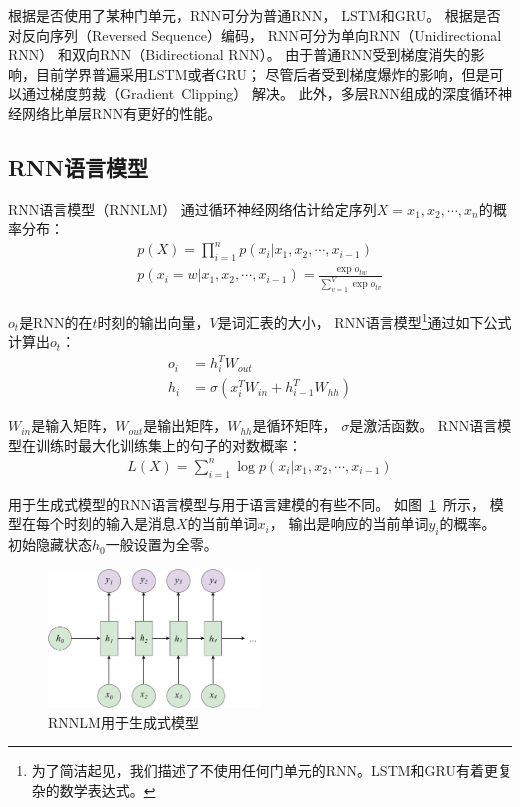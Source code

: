 根据是否使用了某种门单元，RNN可分为普通RNN，
LSTM和GRU。
根据是否对反向序列（Reversed Sequence）编码，
RNN可分为单向RNN（Unidirectional RNN）
和双向RNN（Bidirectional RNN）。
由于普通RNN受到梯度消失的影响，目前学界普遍采用LSTM或者GRU；
尽管后者受到梯度爆炸的影响，但是可以通过梯度剪裁（Gradient~Clipping）
解决。
此外，多层RNN组成的深度循环神经网络比单层RNN有更好的性能。

\subsection{RNN语言模型}\label{subsec:RNNLM}
RNN语言模型（RNNLM）
通过循环神经网络估计给定序列$X=x_1, x_2, \cdots, x_n$的概率分布：
\begin{align}
    p(X) = \prod_{i=1}^{n} p(x_i|x_1, x_2, \cdots, x_{i-1})
    \label{eqn:language_model_probability} \\
    p(x_i = w|x_1, x_2, \cdots, x_{i-1}) = \frac{\exp{o_{tw}}}{\sum_{v=1}^V \exp{o_{tv}}}
    \label{eqn:language_model_estimation}
\end{align}

$o_t$是RNN的在$t$时刻的输出向量，$V$是词汇表的大小，
RNN语言模型\footnote{为了简洁起见，我们描述了不使用任何门单元的RNN。LSTM和GRU有着更复杂的数学表达式。}通过如下公式计算出$o_t$：
\begin{align}
    o_i &= h_i^T W_{out} \\
    h_i &= \sigma \left( x_i^T W_{in} + h_{i-1}^T W_{hh} \right)
\end{align}

$W_{in}$是输入矩阵，$W_{out}$是输出矩阵，$W_{hh}$是循环矩阵，
$\sigma$是激活函数。
RNN语言模型在训练时最大化训练集上的句子的对数概率：
\begin{align}
    \mathit{L(X)} = \sum_{i=1}^n \log p(x_i|x_1, x_2, \cdots, x_{i-1})
\end{align}

用于生成式模型的RNN语言模型与用于语言建模的有些不同。
如图~\ref{fig:RNNLM_as_generative}~所示，
模型在每个时刻的输入是消息$X$的当前单词$x_i$，
输出是响应的当前单词$y_i$的概率。
初始隐藏状态$h_0$一般设置为全零。
\begin{figure}
    \centering
    \includegraphics[width=0.5\textwidth]{figure/drawio/RNNLM-1_v2.pdf}
    \caption{RNNLM用于生成式模型}
    \label{fig:RNNLM_as_generative}
\end{figure}

